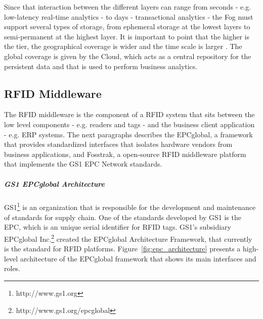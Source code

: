 Since that interaction between the different layers can range from seconds - e.g. low-latency real-time
analytics - to days - transactional analytics - the Fog must support several types of storage, from
ephemeral storage at the lowest layers to semi-permanent at the highest layer. It is important to point
that the higher is the tier, the geographical coverage is wider and the time scale is larger \cite{bonomi2014fog}.
The global coverage is given by the Cloud, which acts as a central repository for the persistent data
and that is used to perform business analytics.

\subsection{RFID Middleware}
\label{sub:rfid_middleware}
The \gls{RFID} middleware is the component of a \gls{RFID} system that sits between the low level
components - e.g. readers and tags - and the business client application - e.g. \gls{ERP} systems.
The next paragraphs describes the EPCglobal, a framework that provides standardized interfaces that
isolates hardware vendors from business applications, and Fosstrak, a open-source \gls{RFID}
middleware platform that implements the GS1 \gls{EPC} Network standards.

\subparagraph{GS1 EPCglobal Architecture}
\label{subp:epc_network}
GS1\footnote{http://www.gs1.org} is an organization that is responsible for the development and maintenance of standards for
supply chain. One of the standards developed by GS1 is the \gls{EPC}, which is an unique serial identifier
for \gls{RFID} tags. GS1's subsidiary EPCglobal Inc.\footnote{http://www.gs1.org/epcglobal} created
the EPCglobal Architecture Framework, that currently is the standard for \gls{RFID} platforms.
Figure~\ref{fig:epc_architecture} presents a high-level architecture of the EPCglobal framework
that shows its main interfaces and roles.\\


